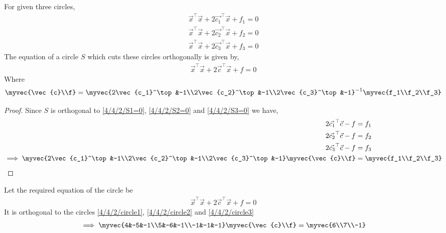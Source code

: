 \begin{lemma}
For given three circles,
\begin{align}
    \vec{x}^\top\vec{x} + 2\vec{c_1}^\top\vec{x} + f_1 = 0 \label{4/4/2/S1=0}\\
    \vec{x}^\top\vec{x} + 2\vec{c_2}^\top\vec{x} + f_2 = 0 \label{4/4/2/S2=0}\\
    \vec{x}^\top\vec{x} + 2\vec{c_3}^\top\vec{x} + f_3 = 0 \label{4/4/2/S3=0}
\end{align}
The equation of a circle $S$ which cuts these circles orthogonally is given by,
\begin{align}
    \vec{x}^\top\vec{x} + 2\vec{c}^\top\vec{x} + f = 0 \label{4/4/2/S=0}
\end{align}
Where 
\begin{align}
    \myvec{\vec{c}\\f} = \myvec{2\vec{c_1}^\top&-1\\2\vec{c_2}^\top&-1\\2\vec{c_3}^\top&-1}^{-1}\myvec{f_1\\f_2\\f_3}
\end{align}
\end{lemma}\label{4/4/2/lemma2}
\begin{proof}
Since $S$ is orthogonal to \eqref{4/4/2/S1=0}, \eqref{4/4/2/S2=0} and \eqref{4/4/2/S3=0} we have,
\begin{align}
    2\vec{c_1}^\top\vec{c} - f &= f_1\\
    2\vec{c_2}^\top\vec{c} - f &=  f_2\\
    2\vec{c_3}^\top\vec{c} - f &= f_3\\
    \implies \myvec{2\vec{c_1}^\top&-1\\2\vec{c_2}^\top&-1\\2\vec{c_3}^\top&-1}\myvec{\vec{c}\\f} &= \myvec{f_1\\f_2\\f_3}\\
\end{align}
\end{proof}
Let the required equation of the circle be
\begin{align}
    \vec{x}^\top\vec{x} + 2\vec{c}^\top\vec{x} + f = 0
\end{align}
It is orthogonal to the circles \eqref{4/4/2/circle1}, \eqref{4/4/2/circle2} and \eqref{4/4/2/circle3}
\begin{align}
    \implies \myvec{4&-5&-1\\5&-6&-1\\-1&-1&-1}\myvec{\vec{c}\\f} = \myvec{6\\7\\-1}
\end{align}
